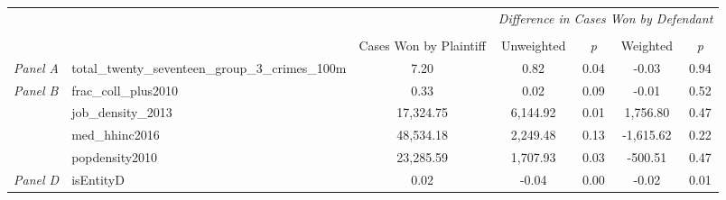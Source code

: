 \begin{tabular}{llccccc}
\toprule
 &  & \textit{} & \multicolumn{4}{c}{\textit{Difference in Cases Won by Defendant}} \\
\cline{4-7}
\\
 &  & Cases Won by Plaintiff & Unweighted & \emph{p} & Weighted & \emph{p} \\
\midrule
\textit{Panel A} & total_twenty_seventeen_group_3_crimes_100m & 7.20 & 0.82 & 0.04 & -0.03 & 0.94 \\
\cline{1-7}
\multirow[c]{4}{3cm}{\textit{Panel B}} & frac_coll_plus2010 & 0.33 & 0.02 & 0.09 & -0.01 & 0.52 \\
 & job_density_2013 & 17,324.75 & 6,144.92 & 0.01 & 1,756.80 & 0.47 \\
 & med_hhinc2016 & 48,534.18 & 2,249.48 & 0.13 & -1,615.62 & 0.22 \\
 & popdensity2010 & 23,285.59 & 1,707.93 & 0.03 & -500.51 & 0.47 \\
\cline{1-7}
\textit{Panel D} & isEntityD & 0.02 & -0.04 & 0.00 & -0.02 & 0.01 \\
\cline{1-7}
\bottomrule
\end{tabular}
